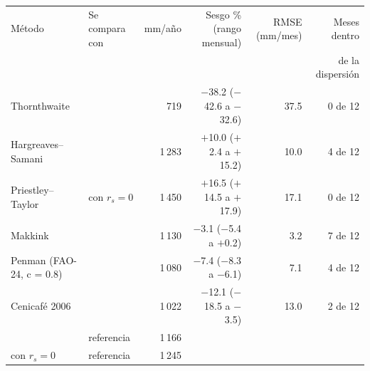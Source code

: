 \begin{tabular}{llrrrr}
\toprule
Método & Se compara con & mm/año & Sesgo \% (rango mensual) & RMSE (mm/mes) & Meses dentro \\
 & & & & & de la dispersión \\
\midrule
Thornthwaite & \PM{} & 719 & $-$38.2 ($-$42.6 a $-$32.6) & 37.5 & 0 de 12 \\
Hargreaves–Samani & \PM{} & 1\,283 & $+$10.0 ($+$2.4 a $+$15.2) & 10.0 & 4 de 12 \\
Priestley–Taylor & \PM{} con $r_s = 0$ & 1\,450 & $+$16.5 ($+$14.5 a $+$17.9) & 17.1 & 0 de 12 \\
Makkink & \PM{} & 1\,130 & $-$3.1 ($-$5.4 a $+$0.2) & 3.2 & 7 de 12 \\
Penman (FAO-24, c = 0.8) & \PM{} & 1\,080 & $-$7.4 ($-$8.3 a $-$6.1) & 7.1 & 4 de 12 \\
Cenicafé 2006 & \PM{} & 1\,022 & $-$12.1 ($-$18.5 a $-$3.5) & 13.0 & 2 de 12 \\
\midrule
\ETo{} \PM{} & referencia & 1\,166 & & & \\
\PM{} con $r_s = 0$ & referencia & 1\,245 & & & \\
\bottomrule
\end{tabular}
